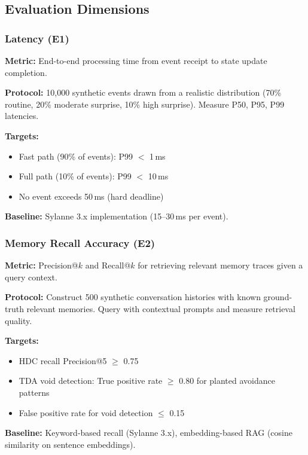\documentclass[10pt,twocolumn]{article}
\begin{document}
\subsection{Evaluation Dimensions}

\subsubsection{Latency (E1)}

\textbf{Metric:} End-to-end processing time from event receipt to state update completion.

\textbf{Protocol:} 10,000 synthetic events drawn from a realistic distribution (70\% routine, 20\% moderate surprise, 10\% high surprise). Measure P50, P95, P99 latencies.

\textbf{Targets:}
\begin{itemize}[nosep,leftmargin=*]
\item Fast path (90\% of events): P99 $<$ 1\,ms
\item Full path (10\% of events): P99 $<$ 10\,ms
\item No event exceeds 50\,ms (hard deadline)
\end{itemize}

\textbf{Baseline:} Sylanne 3.x implementation (15--30\,ms per event).

\subsubsection{Memory Recall Accuracy (E2)}

\textbf{Metric:} Precision@$k$ and Recall@$k$ for retrieving relevant memory traces given a query context.

\textbf{Protocol:} Construct 500 synthetic conversation histories with known ground-truth relevant memories. Query with contextual prompts and measure retrieval quality.

\textbf{Targets:}
\begin{itemize}[nosep,leftmargin=*]
\item HDC recall Precision@5 $\geq$ 0.75
\item TDA void detection: True positive rate $\geq$ 0.80 for planted avoidance patterns
\item False positive rate for void detection $\leq$ 0.15
\end{itemize}

\textbf{Baseline:} Keyword-based recall (Sylanne 3.x), embedding-based RAG (cosine similarity on sentence embeddings).
\end{document}

